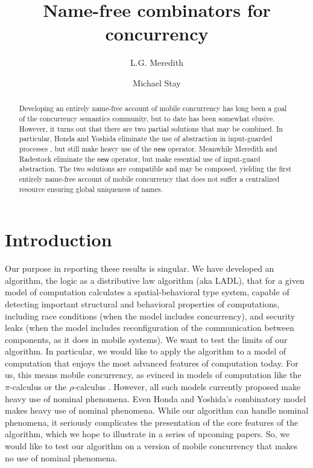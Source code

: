\documentclass[submission,copyright,creativecommons]{eptcs}
\title{Name-free combinators for concurrency}
\author{L.G. Meredith
\institute{RChain Cooperative\\ Washington State}
\email{lgreg.meredith@rchain.coop}
\and
Michael Stay
\institute{Pyrofex Corp.\\Utah, USA}
\email{\quad stay@pyrofex.net}
}
\newcommand{\pic}{$\pi$-calculus}
\newcommand{\rhoc}{$\rho$-calculus}
\theoremstyle{definition}
\theoremstyle{remark}
\theoremstyle{remark}
\begin{document}
\maketitle
\begin{abstract}
\noindent
  Developing an entirely name-free account of mobile concurrency has
  long been a goal of the concurrency semantics community, but to date
  has been somewhat elusive. However, it turns out that there are two
  partial solutions that may be combined. In particular, Honda and
  Yoshida eliminate the use of abstraction in input-guarded processes
  \cite{DBLP:conf/popl/HondaY94,DBLP:journals/tcs/Yoshida02}, but
  still make heavy use of the $\mathsf{new}$ operator. Meanwhile
  Meredith and Radestock \cite{DBLP:journals/entcs/MeredithR05}
  eliminate the $\mathsf{new}$ operator, but make essential use of
  input-guard abstraction. The two solutions are compatible and may be
  composed, yielding the first entirely name-free account of mobile
  concurrency that does not suffer a centralized resource ensuring
  global uniqueness of names.
\end{abstract}

\section{Introduction}

Our purpose in reporting these results is singular. We have developed
an algorithm, the logic as a distributive law algorithm (aka LADL),
that for a given model of computation calculates a spatial-behavioral
type system, capable of detecting important structural and behavioral
properties of computations, including race conditions (when the model
includes concurrency), and security leaks (when the model includes
reconfiguration of the communication between components, as it does in
mobile systems). We want to test the limits of our algorithm. In
particular, we would like to apply the algorithm to a model of
computation that enjoys the most advanced features of computation
today. For us, this means mobile concurrency, as evinced in models of
computation like the {\pic} or the {\rhoc}
\cite{DBLP:conf/concur/Milner92,DBLP:journals/entcs/MeredithR05}.
However, all such models currently proposed make heavy use of nominal
phenomena. Even Honda and Yoshida's combinatory model
\cite{DBLP:conf/popl/HondaY94,DBLP:journals/tcs/Yoshida02} makes heavy
use of nominal phenomena. While our algorithm can handle nominal
phenomena, it seriously complicates the presentation of the core
features of the algorithm, which we hope to illustrate in a series of
upcoming papers. So, we would like to test our algorithm on a version
of mobile concurrency that makes no use of nominal phenomena.
\end{document}
